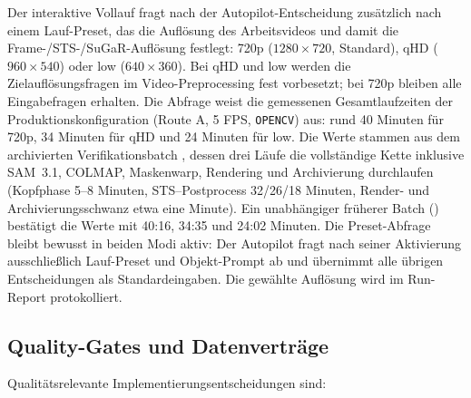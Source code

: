 Der interaktive Vollauf fragt nach der Autopilot-Entscheidung zusätzlich nach
einem Lauf-Preset, das die Auflösung des Arbeitsvideos und damit die
Frame-/STS-/SuGaR-Auflösung festlegt: 720p ($1280\times720$, Standard),
qHD ($960\times540$) oder low ($640\times360$). Bei qHD und low werden die
Zielauflösungsfragen im Video-Preprocessing fest vorbesetzt; bei 720p bleiben
alle Eingabefragen erhalten. Die Abfrage weist die gemessenen Gesamtlaufzeiten
der Produktionskonfiguration (Route A, 5 FPS,
\texttt{OPENCV}) aus: rund 40 Minuten für 720p, 34 Minuten für qHD und
24 Minuten für low. Die Werte stammen aus dem archivierten
Verifikationsbatch , dessen drei Läufe
die vollständige Kette inklusive SAM~3.1, COLMAP, Maskenwarp, Rendering und
Archivierung durchlaufen (Kopfphase 5--8 Minuten, STS--Postprocess
32/26/18 Minuten, Render- und Archivierungsschwanz etwa eine Minute). Ein
unabhängiger früherer Batch ()
bestätigt die Werte mit 40:16, 34:35 und 24:02 Minuten. Die
Preset-Abfrage bleibt bewusst in beiden Modi
aktiv: Der Autopilot fragt nach seiner Aktivierung ausschließlich Lauf-Preset
und Objekt-Prompt ab und übernimmt alle übrigen Entscheidungen als
Standardeingaben. Die gewählte Auflösung wird im Run-Report protokolliert.

\subsection{Quality-Gates und Datenverträge}

Qualitätsrelevante Implementierungsentscheidungen sind:

